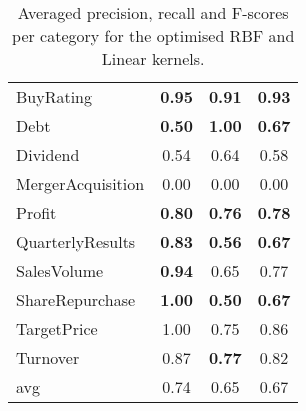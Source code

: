 \documentclass[11pt,a4paper]{article}
\begin{document}
\begin{table}[ht!]
{\begin{tabular}{p{2.8cm} c c c}
			\hline
			BuyRating         & \textbf{0.95}      & \textbf{0.91}   & \textbf{0.93}        \\
			Debt              & \textbf{0.50}      & \textbf{1.00}   & \textbf{0.67}        \\
			Dividend          & 0.54               & 0.64            & 0.58                 \\
			MergerAcquisition & 0.00               & 0.00            & 0.00                 \\
			Profit            & \textbf{0.80}      & \textbf{0.76}   & \textbf{0.78}        \\
			QuarterlyResults  & \textbf{0.83}      & \textbf{0.56}   & \textbf{0.67}        \\
			SalesVolume       & \textbf{0.94}      & 0.65            & 0.77                 \\
			ShareRepurchase   & \textbf{1.00}      & \textbf{0.50}   & \textbf{0.67}        \\
			TargetPrice       & 1.00               & 0.75            & 0.86                 \\
			Turnover          & 0.87               & \textbf{0.77}   & 0.82                 \\
			\hline                                                                          
			avg               & 0.74               & 0.65            & 0.67                 \\
			\hline            
		\end{tabular}
		\caption{Averaged precision, recall and F-scores per category for the optimised RBF  and Linear kernels.}
		\label{svmresults}
	}
\end{table}
\end{document}
